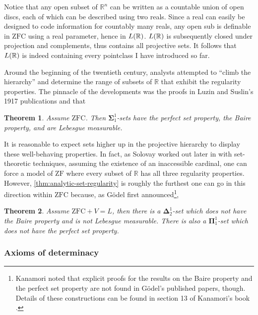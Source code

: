\documentclass[12pt]{article}
\theoremstyle{plain}
\newtheorem{theorem}{Theorem}[section]
\theoremstyle{definition}
\newcommand{\ZFC}{\mathrm{ZFC}}
\newcommand{\ZF}{\mathrm{ZF}}
\begin{document}
Notice that any open subset of $\mathbb{R}^n$ can be written as a countable union of open discs, each of which can be described using two reals. Since a real can easily be designed to code information for countably many reals, any open sub is definable in $\ZFC$ using a real parameter, hence in $L\mleft(\mathbb{R}\mright)$. $L\mleft(\mathbb{R}\mright)$ is subsequently closed under projection and complements, thus contains all projective sets. It follows that $L\mleft(\mathbb{R}\mright)$ is indeed containing every pointclass I have introduced so far.

Around the beginning of the twentieth century, analysts attempted to ``climb the hierarchy'' and determine the range of subsets of $\mathbb{R}$ that exhibit the regularity properties. The pinnacle of the developments was the proofs in Luzin and Suslin's 1917 publications \cite{luzin-analytic-sets} and \cite{suslin-analytic-sets} that

\begin{theorem}
	\label{thm:analytic-set-regularity}
	Assume $\ZFC$. Then $\boldsymbol\Sigma^1_1$-sets have the perfect set property, the Baire property, and are Lebesgue measurable.
\end{theorem}

It is reasonable to expect sets higher up in the projective hierarchy to display these well-behaving properties. In fact, as Solovay worked out later in \cite{solovay-force-regularity} with set-theoretic techniques, assuming the existence of an inaccessible cardinal, one can force a model of $\ZF$ where every subset of $\mathbb{R}$ has all three regularity properties. However, \autoref{thm:analytic-set-regularity} is roughly the furthest one can go in this direction within $\ZFC$ because, as G\"odel first announced\footnote{Kanamori noted that explicit proofs for the results on the Baire property and the perfect set property are not found in G\"odel's published papers, though. Details of these constructions can be found in section 13 of Kanamori's book \cite{higher-infinite}.},

\begin{theorem}
	Assume $\ZFC + V = L$, then there is a $\boldsymbol\Delta^1_2$-set which does not have the Baire property and is not Lebesgue measurable. There is also a $\boldsymbol\Pi^1_1$-set which does not have the perfect set property.
\end{theorem}

\subsubsection*{Axioms of determinacy}
\end{document}

